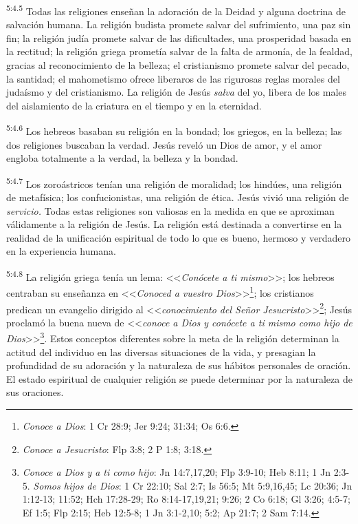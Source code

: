 \par
\textsuperscript{5:4.5} Todas las religiones enseñan la adoración de la Deidad y alguna doctrina de salvación humana. La religión budista promete salvar del sufrimiento, una paz sin fin; la religión judía promete salvar de las dificultades, una prosperidad basada en la rectitud; la religión griega prometía salvar de la falta de armonía, de la fealdad, gracias al reconocimiento de la belleza; el cristianismo promete salvar del pecado, la santidad; el mahometismo ofrece liberaros de las rigurosas reglas morales del judaísmo y del cristianismo. La religión de Jesús \textit{salva} del yo, libera de los males del aislamiento de la criatura en el tiempo y en la eternidad.

\par
\textsuperscript{5:4.6} Los hebreos basaban su religión en la bondad; los griegos, en la belleza; las dos religiones buscaban la verdad. Jesús reveló un Dios de amor, y el amor engloba totalmente a la verdad, la belleza y la bondad.

\par
\textsuperscript{5:4.7} Los zoroástricos tenían una religión de moralidad; los hindúes, una religión de metafísica; los confucionistas, una religión de ética. Jesús vivió una religión de \textit{servicio.} Todas estas religiones son valiosas en la medida en que se aproximan válidamente a la religión de Jesús. La religión está destinada a convertirse en la realidad de la unificación espiritual de todo lo que es bueno, hermoso y verdadero en la experiencia humana.

\par
\textsuperscript{5:4.8} La religión griega tenía un lema: <<\textit{Conócete a ti mismo}>>; los hebreos centraban su enseñanza en <<\textit{Conoced a vuestro Dios}>>\footnote{\textit{Conoce a Dios}: 1 Cr 28:9; Jer 9:24; 31:34; Os 6:6.}; los cristianos predican un evangelio dirigido al <<\textit{conocimiento del Señor Jesucristo}>>\footnote{\textit{Conoce a Jesucristo}: Flp 3:8; 2 P 1:8; 3:18.}; Jesús proclamó la buena nueva de <<\textit{conoce a Dios y conócete a ti mismo como hijo de Dios}>>\footnote{\textit{Conoce a Dios y a ti como hijo}: Jn 14:7,17,20; Flp 3:9-10; Heb 8:11; 1 Jn 2:3-5. \textit{Somos hijos de Dios}: 1 Cr 22:10; Sal 2:7; Is 56:5; Mt 5:9,16,45; Lc 20:36; Jn 1:12-13; 11:52; Hch 17:28-29; Ro 8:14-17,19,21; 9:26; 2 Co 6:18; Gl 3:26; 4:5-7; Ef 1:5; Flp 2:15; Heb 12:5-8; 1 Jn 3:1-2,10; 5:2; Ap 21:7; 2 Sam 7:14.}. Estos conceptos diferentes sobre la meta de la religión determinan la actitud del individuo en las diversas situaciones de la vida, y presagian la profundidad de su adoración y la naturaleza de sus hábitos personales de oración. El estado espiritual de cualquier religión se puede determinar por la naturaleza de sus oraciones.

